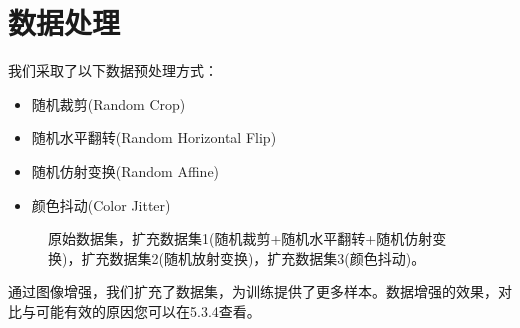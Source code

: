 \documentclass{article}
\theoremstyle{definition}
\begin{document}
\section{数据处理}
我们采取了以下数据预处理方式：
\begin{itemize}
\item 随机裁剪(Random Crop)
\item 随机水平翻转(Random Horizontal Flip)
\item 随机仿射变换(Random Affine)
\item 颜色抖动(Color Jitter)
\end{itemize}

\begin{figure}[H]
	\centering
	\caption{原始数据集，扩充数据集1(随机裁剪+随机水平翻转+随机仿射变换)，扩充数据集2(随机放射变换)，扩充数据集3(颜色抖动)。}
\end{figure}
通过图像增强，我们扩充了数据集，为训练提供了更多样本。数据增强的效果，对比与可能有效的原因您可以在5.3.4查看。
\end{document}
